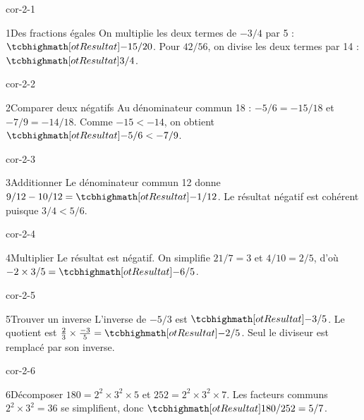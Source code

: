 \clearpage\pagestyle{otMain}\setlength{\otBlocEspacement}{2.5mm}\fontsize{11}{15}\selectfont{}
\begin{blocLivre}{cor-2-1}\begin{corrige}{1}{Des fractions égales}
On multiplie les deux termes de $-3/4$ par 5 : $\res{-15/20}$. Pour $42/56$, on divise les deux termes par 14 : $\res{3/4}$.
\end{corrige}\end{blocLivre}
\begin{blocLivre}{cor-2-2}\begin{corrige}{2}{Comparer deux négatifs}
Au dénominateur commun 18 : $-5/6=-15/18$ et $-7/9=-14/18$. Comme $-15<-14$, on obtient $\res{-5/6<-7/9}$.
\end{corrige}\end{blocLivre}
\begin{blocLivre}{cor-2-3}\begin{corrige}{3}{Additionner}
Le dénominateur commun 12 donne $9/12-10/12=\res{-1/12}$. Le résultat négatif est cohérent puisque $3/4<5/6$.
\end{corrige}\end{blocLivre}
\begin{blocLivre}{cor-2-4}\begin{corrige}{4}{Multiplier}
Le résultat est négatif. On simplifie $21/7=3$ et $4/10=2/5$, d’où $-2\times3/5=\res{-6/5}$.
\end{corrige}\end{blocLivre}
\begin{blocLivre}{cor-2-5}\begin{corrige}{5}{Trouver un inverse}
L’inverse de $-5/3$ est $\res{-3/5}$. Le quotient est $\frac23\times\frac{-3}5=\res{-2/5}$. Seul le diviseur est remplacé par son inverse.
\end{corrige}\end{blocLivre}
\begin{blocLivre}{cor-2-6}\begin{corrige}{6}{Décomposer}
$180=2^2\times3^2\times5$ et $252=2^2\times3^2\times7$. Les facteurs communs $2^2\times3^2=36$ se simplifient, donc $\res{180/252=5/7}$.
\label{fig-cor-2-6}
\end{corrige}\end{blocLivre}
